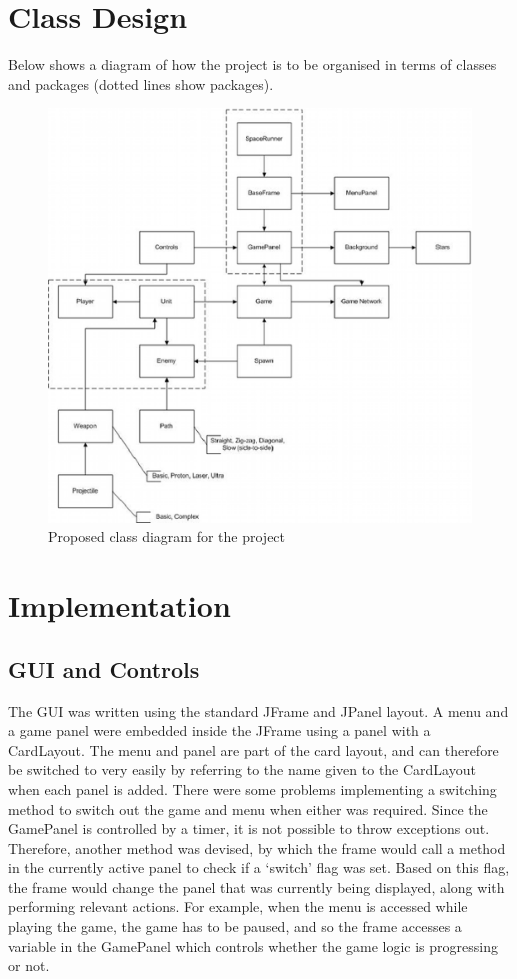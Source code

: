 \section{Class Design}
\label{sec: class_design}
Below shows a diagram of how the project is to be organised in terms of classes and packages (dotted lines show packages).
\begin{figure}
 \centering
 \includegraphics{class_diagram_small.eps}
 \caption{Proposed class diagram for the project}
 \label{fig: class_diagram}
\end{figure}

\section{Implementation}
\subsection{GUI and Controls}
The GUI was written using the standard JFrame and JPanel layout. A menu and a game panel were embedded inside the JFrame using a panel with a CardLayout. The menu and panel are part of the card layout, and can therefore be switched to very easily by referring to the name given to the CardLayout when each panel is added. There were some problems implementing a switching method to switch out the game and menu when either was required. Since the GamePanel is controlled by a timer, it is not possible to throw exceptions out. Therefore, another method was devised, by which the frame would call a method in the currently active panel to check if a `switch' flag was set. Based on this flag, the frame would change the panel that was currently being displayed, along with performing relevant actions. For example, when the menu is accessed while playing the game, the game has to be paused, and so the frame accesses a variable in the GamePanel which controls whether the game logic is progressing or not.

